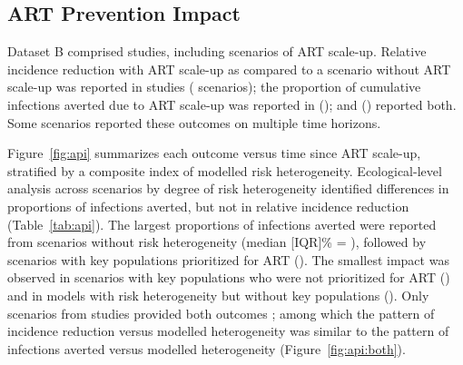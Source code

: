 \subsection{ART Prevention Impact}
\label{ss:res:api}
Dataset B comprised  studies,
including  scenarios of ART scale-up.
Relative incidence reduction with ART scale-up
as compared to a scenario without ART scale-up
was reported in  studies ( scenarios);
the proportion of cumulative infections averted due to ART scale-up
was reported in  ();
and  () reported both.
Some scenarios reported these outcomes on multiple time horizons.
\par
Figure~\ref{fig:api} summarizes each outcome versus time since ART scale-up,
stratified by a composite index of modelled risk heterogeneity.
Ecological-level analysis across scenarios by degree of risk heterogeneity
identified differences in proportions of infections averted,
but not in relative incidence reduction (Table~\ref{tab:api}).
The largest proportions of infections averted were reported from 
scenarios without risk heterogeneity (median [IQR]\% = ), followed by
scenarios with key populations prioritized for ART ().
The smallest impact was observed in scenarios with
key populations who were not prioritized for ART ()
and in models with risk heterogeneity but without key populations
().
Only  scenarios from  studies provided both outcomes
\cite{Salomon2005,Abbas2006,Pretorius2010,Nichols2014,Barnighausen2016,Maheu-Giroux2017,Akudibillah2018}; %
among which the pattern of incidence reduction versus modelled heterogeneity
was similar to the pattern of infections averted versus modelled heterogeneity
(Figure~\ref{fig:api:both}).
